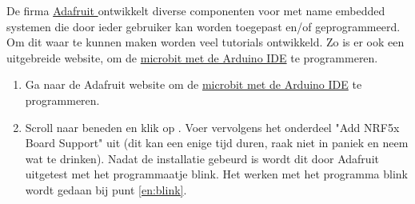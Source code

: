De firma \href{https://www.adafruit.com/about}{Adafruit } ontwikkelt diverse componenten voor met name embedded systemen
die door ieder gebruiker kan worden toegepast en/of geprogrammeerd. Om dit waar te kunnen maken worden veel tutorials ontwikkeld. Zo is er ook een uitgebreide website, om de \href{https://learn.adafruit.com/use-micro-bit-with-arduino}{microbit met de Arduino IDE} te programmeren.
\begin{enumerate}
	\item Ga naar de Adafruit website om  de \href{https://learn.adafruit.com/use-micro-bit-with-arduino}{microbit met de Arduino IDE} te programmeren.
	\item Scroll naar beneden en klik op . Voer vervolgens het onderdeel "Add NRF5x Board Support" uit (dit kan een enige tijd duren, raak niet in paniek en neem wat te drinken). Nadat de installatie gebeurd is wordt dit door Adafruit uitgetest met het programmaatje blink. Het werken met het programma blink wordt gedaan bij punt \ref{en:blink}.
	

\end{enumerate}
